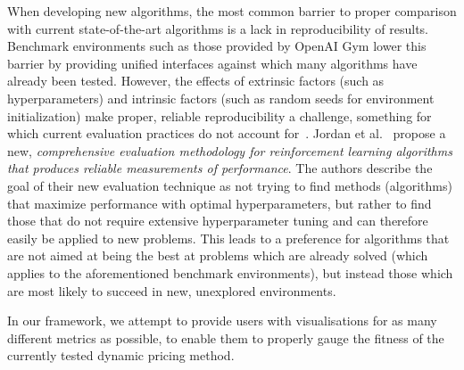 When developing new algorithms, the most common barrier to proper comparison with current state-of-the-art algorithms is a lack in reproducibility of results. Benchmark environments such as those provided by OpenAI Gym \cite{OpenAIGym} lower this barrier by providing unified interfaces against which many algorithms have already been tested. However, the effects of extrinsic factors (such as hyperparameters) and intrinsic factors (such as random seeds for environment initialization) make proper, reliable reproducibility a challenge, something for which current evaluation practices do not account for~\cite{DRLThatMatters}. Jordan et al.~\cite{EvaluatingPerformance} propose a new, \emph{comprehensive evaluation methodology for reinforcement learning algorithms that produces reliable measurements of performance}. The authors describe the goal of their new evaluation technique as not trying to find methods (algorithms) that maximize performance with optimal hyperparameters, but rather to find those that do not require extensive hyperparameter tuning and can therefore easily be applied to new problems. This leads to a preference for algorithms that are not aimed at being the best at problems which are already solved (which applies to the aforementioned benchmark environments), but instead those which are most likely to succeed in new, unexplored environments.

In our framework, we attempt to provide users with visualisations for as many different metrics as possible, to enable them to properly gauge the fitness of the currently tested dynamic pricing method.